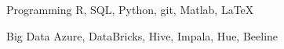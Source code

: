 

\begin{cvskills}

  \cvskill
    {Programming} %
    {R, SQL, Python, git, Matlab, \LaTeX} %

  \cvskill
    {Big Data} %
    {Azure, DataBricks, Hive, Impala, Hue, Beeline} %




\end{cvskills}
